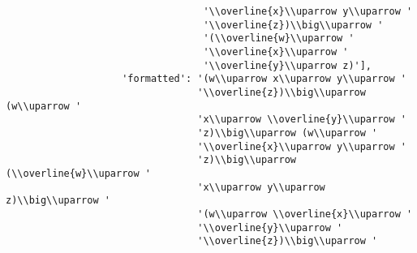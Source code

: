 \begin{verbatim}
                                  '\\overline{x}\\uparrow y\\uparrow '
                                  '\\overline{z})\\big\\uparrow '
                                  '(\\overline{w}\\uparrow '
                                  '\\overline{x}\\uparrow '
                                  '\\overline{y}\\uparrow z)'],
                    'formatted': '(w\\uparrow x\\uparrow y\\uparrow '
                                 '\\overline{z})\\big\\uparrow (w\\uparrow '
                                 'x\\uparrow \\overline{y}\\uparrow '
                                 'z)\\big\\uparrow (w\\uparrow '
                                 '\\overline{x}\\uparrow y\\uparrow '
                                 'z)\\big\\uparrow (\\overline{w}\\uparrow '
                                 'x\\uparrow y\\uparrow z)\\big\\uparrow '
                                 '(w\\uparrow \\overline{x}\\uparrow '
                                 '\\overline{y}\\uparrow '
                                 '\\overline{z})\\big\\uparrow '

\end{verbatim}
